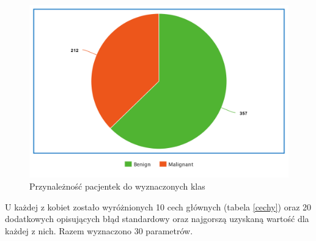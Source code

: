 \documentclass[12pt]{article}
\begin{document}
\begin{figure}[H]
	\centering
		\includegraphics[scale=0.6]{images/pie_chart.png}
	\caption{Przynależność pacjentek do wyznaczonych klas}
	\label{przynaleznosc_pacjentek}
\end{figure}

\indent U każdej z kobiet zostało wyróżnionych 10 cech głównych (tabela \ref{cechy}) oraz 20 dodatkowych opisujących błąd standardowy oraz najgorszą uzyskaną wartość dla każdej z nich. Razem wyznaczono 30 parametrów. 
\newline
\end{document}
